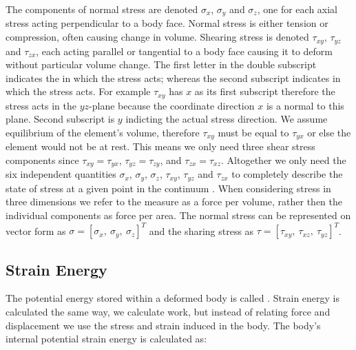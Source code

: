 The components of normal stress are denoted $\sigma_x$,
$\sigma_y$ and $\sigma_z$, one for each axial stress acting
perpendicular to a body face. Normal stress is either tension or
compression, often causing change in volume. Shearing stress is
denoted $\tau_{xy}$, $\tau_{yz}$ and $\tau_{zx}$, each
acting parallel or tangential to a body face causing it
to deform without particular volume change.
The first letter in the double subscript
indicates the  in which the stress acts; whereas the second
subscript indicates in which  the stress
acts.
For example $\tau_{xy}$ has $x$ as its first
subscript therefore the stress acts in the $yz$-plane because the
coordinate direction $x$ is a normal to this plane. Second subscript
is $y$ indicting the actual stress direction.
%
We assume equilibrium of the element's volume, therefore $\tau_{xy}$
must be equal to $\tau_{yx}$ or else the element would not be at
rest. This means we only need three shear stress components since
$\tau_{xy} = \tau_{yx}$, $\tau_{yz} = \tau_{zy}$, and $\tau_{zx} =
\tau_{xz}$.
Altogether we only need the six independent quantities $\sigma_x$,
$\sigma_y$, $\sigma_z$, $\tau_{xy}$, $\tau_{yz}$ and $\tau_{zx}$ to completely
describe the state of stress at a given point in the
continuum .
%
When considering stress in three dimensions we refer to the measure as
a force per volume, rather then the individual components as force per
area. The normal stress can be represented on vector form as
$\sigma = [ \sigma_{x}, \ \sigma_{y}, \ \sigma_{z} ]^T$ and the
sharing stress as 
$\tau = [ \tau_{xy}, \ \tau_{xz}, \ \tau_{yz} ]^T$.

\subsection{Strain Energy}
The potential energy stored within a deformed body is called . Strain energy is calculated the same way, we calculate
work, but instead of relating force and displacement we use the stress
and strain induced in the body. The body's internal potential strain
energy is calculated as:

